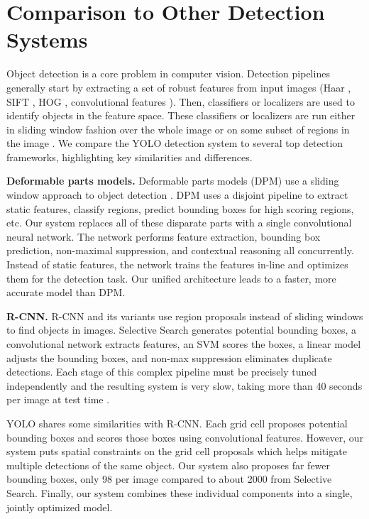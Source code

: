 \documentclass[10pt,twocolumn,letterpaper]{article}
\begin{document}
\section{Comparison to Other Detection Systems}

Object detection is a core problem in computer vision. Detection pipelines generally start by extracting a set of robust features from input images (Haar \cite{papageorgiou1998general}, SIFT \cite{lowe1999object}, HOG \cite{dalal2005histograms}, convolutional features \cite{donahue2013decaf}). Then, classifiers \cite{viola2001robust,lienhart2002extended,girshick2014rich,lsvm-pami} or localizers \cite{blaschko2008learning,DBLP:journals/corr/SermanetEZMFL13} are used to identify objects in the feature space. These classifiers or localizers are run either in sliding window fashion over the whole image or on some subset of regions in the image \cite{uijlings2013selective,gould2009region,zitnick2014edge}. We compare the YOLO detection system to several top detection frameworks, highlighting key similarities and differences.

\textbf{Deformable parts models.} Deformable parts models (DPM) use a sliding window approach to object detection \cite{lsvm-pami}. DPM uses a disjoint pipeline to extract static features, classify regions, predict bounding boxes for high scoring regions, etc. Our system replaces all of these disparate parts with a single convolutional neural network. The network performs feature extraction, bounding box prediction, non-maximal suppression, and contextual reasoning all concurrently. Instead of static features, the network trains the features in-line and optimizes them for the detection task. Our unified architecture leads to a faster, more accurate model than DPM.

\textbf{R-CNN.} R-CNN and its variants use region proposals instead of sliding windows to find objects in images. Selective Search \cite{uijlings2013selective} generates potential bounding boxes, a convolutional network extracts features, an SVM scores the boxes, a linear model adjusts the bounding boxes, and non-max suppression eliminates duplicate detections. Each stage of this complex pipeline must be precisely tuned independently and the resulting system is very slow, taking more than 40 seconds per image at test time \cite{DBLP:journals/corr/Girshick15}.

YOLO shares some similarities with R-CNN. Each grid cell proposes potential bounding boxes and scores those boxes using convolutional features. However, our system puts spatial constraints on the grid cell proposals which helps mitigate multiple detections of the same object. Our system also proposes far fewer bounding boxes, only 98 per image compared to about 2000 from Selective Search. Finally, our system combines these individual components into a single, jointly optimized model.
\end{document}
